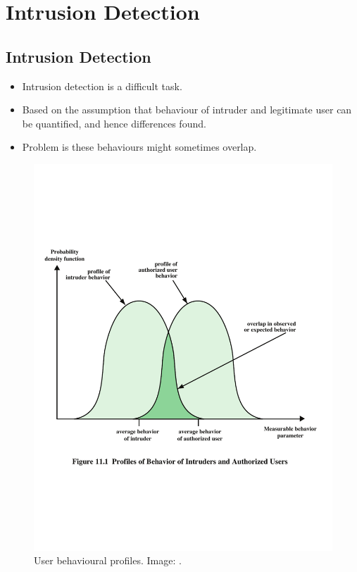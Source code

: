 \documentclass{beamer}
\begin{document}
\section{Intrusion Detection}

\subsection{Intrusion Detection}

\begin{frame}{\insertsubsectionhead}
  \begin{itemize}
    \item Intrusion detection is a difficult task.

    \item Based on the assumption that behaviour of intruder and legitimate 
      user can be quantified, and hence differences found.

    \item Problem is these behaviours might sometimes overlap.

  \end{itemize}
\end{frame}

\begin{frame}{\insertsubsectionhead}
  \begin{figure}
    \includegraphics[height=0.7\textheight]{profiles.pdf}
    \caption{User behavioural profiles.
      Image: \cite{Stallings2013nse}.}
  \end{figure}
\end{frame}
\end{document}
